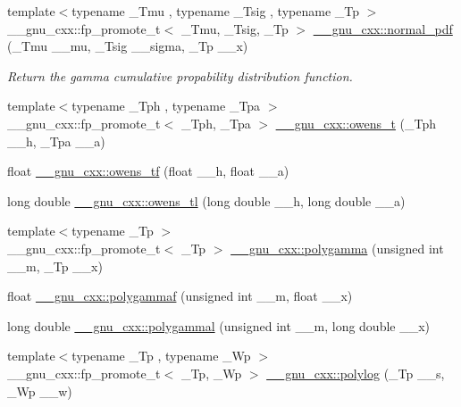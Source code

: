 \begin{DoxyCompactItemize}
{\footnotesize template$<$typename \+\_\+\+Tmu , typename \+\_\+\+Tsig , typename \+\_\+\+Tp $>$ }\\\+\_\+\+\_\+gnu\+\_\+cxx\+::fp\+\_\+promote\+\_\+t$<$ \+\_\+\+Tmu, \+\_\+\+Tsig, \+\_\+\+Tp $>$ \hyperlink{group__gnu__math__spec__func_gab795379781dea732cbc7556351760401}{\+\_\+\+\_\+gnu\+\_\+cxx\+::normal\+\_\+pdf} (\+\_\+\+Tmu \+\_\+\+\_\+mu, \+\_\+\+Tsig \+\_\+\+\_\+sigma, \+\_\+\+Tp \+\_\+\+\_\+x)
\begin{DoxyCompactList}\small\item\em Return the gamma cumulative propability distribution function. \end{DoxyCompactList}\item 
{\footnotesize template$<$typename \+\_\+\+Tph , typename \+\_\+\+Tpa $>$ }\\\+\_\+\+\_\+gnu\+\_\+cxx\+::fp\+\_\+promote\+\_\+t$<$ \+\_\+\+Tph, \+\_\+\+Tpa $>$ \hyperlink{group__gnu__math__spec__func_gab4e367aae19853cca3af99eead01fcaa}{\+\_\+\+\_\+gnu\+\_\+cxx\+::owens\+\_\+t} (\+\_\+\+Tph \+\_\+\+\_\+h, \+\_\+\+Tpa \+\_\+\+\_\+a)
\item 
float \hyperlink{group__gnu__math__spec__func_gac24d32e9b072c4953654d5559f992871}{\+\_\+\+\_\+gnu\+\_\+cxx\+::owens\+\_\+tf} (float \+\_\+\+\_\+h, float \+\_\+\+\_\+a)
\item 
long double \hyperlink{group__gnu__math__spec__func_ga7a8bc60dc0ef4a009586872eb7cac2d0}{\+\_\+\+\_\+gnu\+\_\+cxx\+::owens\+\_\+tl} (long double \+\_\+\+\_\+h, long double \+\_\+\+\_\+a)
\item 
{\footnotesize template$<$typename \+\_\+\+Tp $>$ }\\\+\_\+\+\_\+gnu\+\_\+cxx\+::fp\+\_\+promote\+\_\+t$<$ \+\_\+\+Tp $>$ \hyperlink{group__gnu__math__spec__func_ga65e674e7fe1457e819897e0d608c18b8}{\+\_\+\+\_\+gnu\+\_\+cxx\+::polygamma} (unsigned int \+\_\+\+\_\+m, \+\_\+\+Tp \+\_\+\+\_\+x)
\item 
float \hyperlink{group__gnu__math__spec__func_ga91861fadef76d4f73afacffcac66e312}{\+\_\+\+\_\+gnu\+\_\+cxx\+::polygammaf} (unsigned int \+\_\+\+\_\+m, float \+\_\+\+\_\+x)
\item 
long double \hyperlink{group__gnu__math__spec__func_gaa6a37359a97ba43f32aa842705c416d4}{\+\_\+\+\_\+gnu\+\_\+cxx\+::polygammal} (unsigned int \+\_\+\+\_\+m, long double \+\_\+\+\_\+x)
\item 
{\footnotesize template$<$typename \+\_\+\+Tp , typename \+\_\+\+Wp $>$ }\\\+\_\+\+\_\+gnu\+\_\+cxx\+::fp\+\_\+promote\+\_\+t$<$ \+\_\+\+Tp, \+\_\+\+Wp $>$ \hyperlink{group__gnu__math__spec__func_gabcc5480ad739561c2debd6a8a352084f}{\+\_\+\+\_\+gnu\+\_\+cxx\+::polylog} (\+\_\+\+Tp \+\_\+\+\_\+s, \+\_\+\+Wp \+\_\+\+\_\+w)

\end{DoxyCompactItemize}
